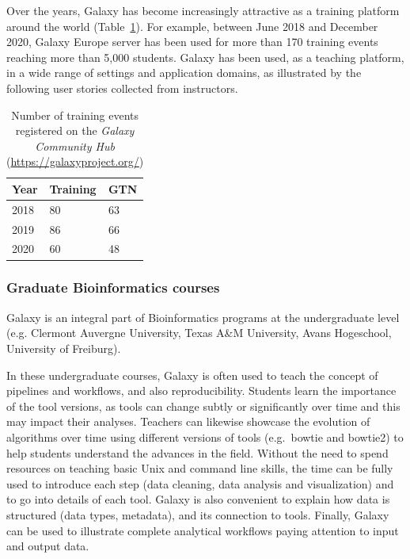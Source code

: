 \documentclass[10pt,letterpaper]{article}
\begin{document}

Over the years, Galaxy has become increasingly attractive as a training platform around the world (Table~\ref{tbl:galaxy_training_stats}). For example, between June 2018 and December 2020, Galaxy Europe server has been used for more than 170 training events reaching more than 5,000 students. Galaxy has been used, as a teaching platform, in a wide range of settings and application domains, as illustrated by the following user stories collected from instructors.

\begin{table}[h!]
	\centering
    \caption{Number of training events registered on the \textit{Galaxy Community Hub} (\url{https://galaxyproject.org/})
    \label{tbl:galaxy_training_stats}}
	\begin{tabular}{lll}
		\textbf{Year} & \textbf{Training} & \textbf{GTN}\\
		\hline
        2018 & 80 & 63 \\
        2019 & 86 & 66 \\
        2020 & 60 & 48 \\
	\end{tabular}
\end{table}


\subsubsection*{Graduate Bioinformatics courses}

Galaxy is an integral part of Bioinformatics programs at the undergraduate level (e.g. Clermont Auvergne University, Texas A\&M University, Avans Hogeschool, University of Freiburg). 

In these undergraduate courses, Galaxy is often used to teach the concept of pipelines and workflows, and also reproducibility. Students learn the importance of the tool versions, as tools can change subtly or significantly over time and this may impact their analyses. Teachers can likewise showcase the evolution of algorithms over time using different versions of tools (e.g.\ bowtie and bowtie2) to help students understand the advances in the field. 
Without the need to spend resources on teaching basic Unix and command line skills, the time can be fully used to introduce each step (data cleaning, data analysis and visualization) and to go into details of each tool. Galaxy is also convenient to explain how data is structured (data types, metadata), and its connection to tools. Finally, Galaxy can be used to illustrate complete analytical workflows paying attention to input and output data.
\end{document}
